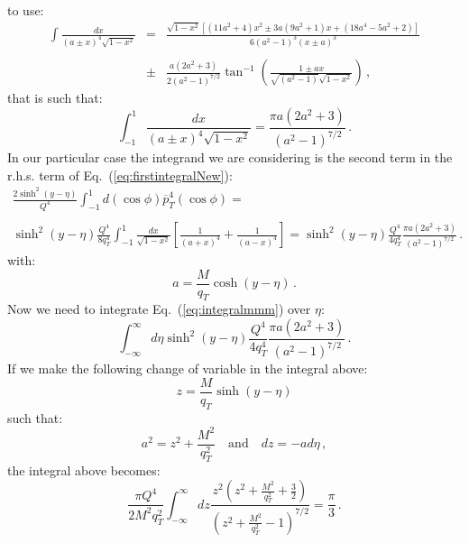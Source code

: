 \documentclass[10pt,a4paper]{article}
\begin{document}
to use:
\begin{equation}\label{eq:complicatedintegral2}
\begin{array}{rcl}
\displaystyle\int \frac{dx}{(a\pm
  x)^4\sqrt{1-x^2}}&=&\displaystyle\frac{\sqrt{1-x^2}\left[(11a^2+4)x^2\pm
                       3 a(9a^2+1)x + (18a^4-5a^2+2)\right]}{6(a^2-1)^3(x\pm
  a)^3}\\
\\
&\pm&\displaystyle\frac{a(2a^2+3)}{2(a^2-1)^{7/2}}\tan^{-1}\left(\frac{1\pm
      ax}{\sqrt{(a^2-1)}\sqrt{1-x^2}}\right)\,,
\end{array}
\end{equation}
that is such that:
\begin{equation}
\int_{-1}^{1} \frac{dx}{(a\pm
  x)^4\sqrt{1-x^2}}=\frac{\pi a(2a^2+3)}{(a^2-1)^{7/2}}\,.
\end{equation}
In our particular case the integrand we are considering is the second
term in the r.h.s. term of Eq.~(\ref{eq:firstintegralNew}):
\begin{equation}\label{eq:integralmmm}
\begin{array}{l}
\displaystyle
  \frac{2\sinh^2(y-\eta)}{Q^4}\int_{-1}^{1}d(\cos\phi)\overline{p}_T^4(\cos\phi)=\\
\\
\displaystyle\sinh^2(y-\eta)\frac{Q^4}{8q_T^4}  \int_{-1}^{1} \frac{dx}{\sqrt{1-x^2}}\left[\frac{1}{(a+
      x)^4}+\frac1{(a-
      x)^4}\right]= \sinh^2(y-\eta)\frac{Q^4}{4q_T^4} \frac{\pi
  a(2a^2+3)}{(a^2-1)^{7/2}}\,.
\end{array}
\end{equation}
with:
\begin{equation}
a =\frac{M}{q_T}\cosh(y-\eta)\,.
\end{equation}
Now we need to integrate Eq.~(\ref{eq:integralmmm}) over $\eta$:
\begin{equation}
\int_{-\infty}^{\infty}d\eta\sinh^2(y-\eta)\frac{Q^4}{4q_T^4} \frac{\pi
  a(2a^2+3)}{(a^2-1)^{7/2}}\,.
\end{equation}
If we make the following change of variable in the integral above:
\begin{equation}
z=\frac{M}{q_T}\sinh(y-\eta)
\end{equation}
such that:
\begin{equation}
a^2 = z^2+\frac{M^2}{q_T^2}\quad\mbox{and}\quad dz = -ad\eta\,,
\end{equation}
the integral above becomes:
\begin{equation}
\frac{\pi Q^4}{2 M^2 q_T^2} \int_{-\infty}^{\infty}dz\frac{
  z^2\left(z^2+\frac{M^2}{q_T^2}+\frac32\right)}{\left(z^2+\frac{M^2}{q_T^2}-1\right)^{7/2}}=\frac{\pi}{3}\,.
\end{equation}
\end{document}
